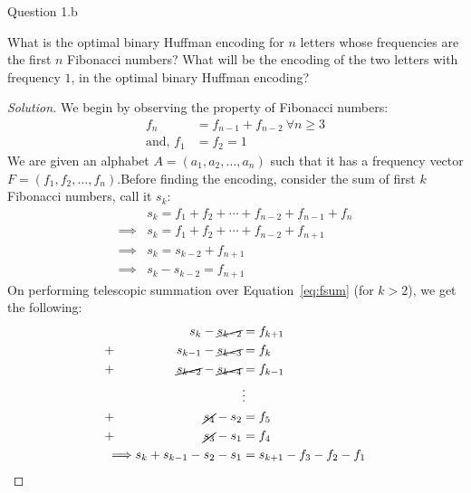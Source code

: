 \begin{solution}{Question 1.b}
    \begin{question}[]
        What is the optimal binary Huffman encoding for $n$ letters whose frequencies are the first $n$ Fibonacci numbers? What will be the encoding of the two letters with frequency $1$, in the optimal binary Huffman encoding?
    \end{question}
    \tcblower{}
    \begin{proof}[Solution]
        We begin by observing the property of Fibonacci numbers:
        \begin{equation}\label{eq:fib}
            \begin{split}
                f_n&=f_{n-1}+f_{n-2}\ \forall n\geq 3\\
                \text{and, } f_1&=f_2=1
            \end{split}
        \end{equation}
        We are given an alphabet $A=(a_1, a_2, \ldots,a_n)$ such that it has a frequency vector $F=(f_1, f_2, \ldots, f_n)$.Before finding the encoding, consider the sum of first $k$ Fibonacci numbers, call it $s_k$:
        \begin{equation}\label{eq:fsum}
            \begin{split}
                &s_k=f_1+f_2+\cdots+f_{n-2}+f_{n-1}+f_n\\
                \implies &s_k=f_1+f_2+\cdots+f_{n-2}+f_{n+1}\\
                \implies &s_k=s_{k-2}+f_{n+1}\\
                \implies &s_k-s_{k-2}=f_{n+1}
            \end{split}
        \end{equation}
        On performing telescopic summation over Equation~\ref{eq:fsum} (for $k>2$), we get the following:
        \begin{equation}\label{eq:skeval}
            \begin{alignedat}{4}
                & &s_k-\cancel{s_{k-2}} &=f_{k+1}\\
                &+ &s_{k-1}-\cancel{s_{k-3}} &=f_{k}\\
                &+ &\cancel{s_{k-2}}-\cancel{s_{k-4}} &=f_{k-1}\\
                & & &\vdots\\
                &+ &\cancel{s_4}-s_2 &=f_5\\
                &+ &\cancel{s_3}-s_1 &=f_4\\
                &\implies &s_k+s_{k-1}-s_2-s_1 &=s_{k+1}-f_3-f_2-f_1\\

\end{alignedat}
\end{equation}
\end{proof}
\end{solution}

